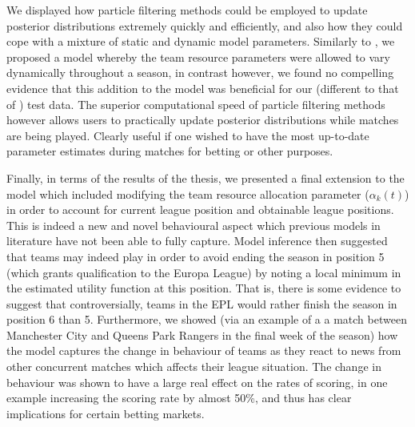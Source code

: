 We displayed how particle filtering methods could be employed to update posterior distributions extremely quickly and
efficiently, and also how they could cope with a mixture of static and dynamic model parameters. Similarly to
\cite{Owen2011}, we proposed a model whereby the team resource parameters were allowed to vary dynamically throughout a
season, in contrast however, we found no compelling evidence that this addition to the model was beneficial for our
(different to that of \cite{Owen2011}) test data. The superior computational speed of particle filtering methods however
allows users to practically update posterior distributions while matches are being played. Clearly useful if one wished
to have the most up-to-date parameter estimates during matches for betting or other purposes.

Finally, in terms of the results of the thesis, we presented a final extension to the model which included modifying the
team resource allocation parameter (\(\alpha_k(t)\)) in order to account for current league position and obtainable
league positions. This is indeed a new and novel behavioural aspect which previous models in literature have not been
able to fully capture. Model inference then suggested that teams may indeed play in order to avoid ending the season in
position 5 (which grants qualification to the Europa League) by noting a local minimum in the estimated utility function
at this position. That is, there is some evidence to suggest that controversially, teams in the \gls{EPL} would rather
finish the season in position 6 than 5. Furthermore, we showed (via an example of a a match between Manchester City and
Queens Park Rangers in the final week of the season) how the model captures the change in behaviour of teams as they
react to news from other concurrent matches which affects their league situation. The change in behaviour was shown to
have a large real effect on the rates of scoring, in one example increasing the scoring rate by almost 50\%, and thus
has clear implications for certain betting markets.

% 

